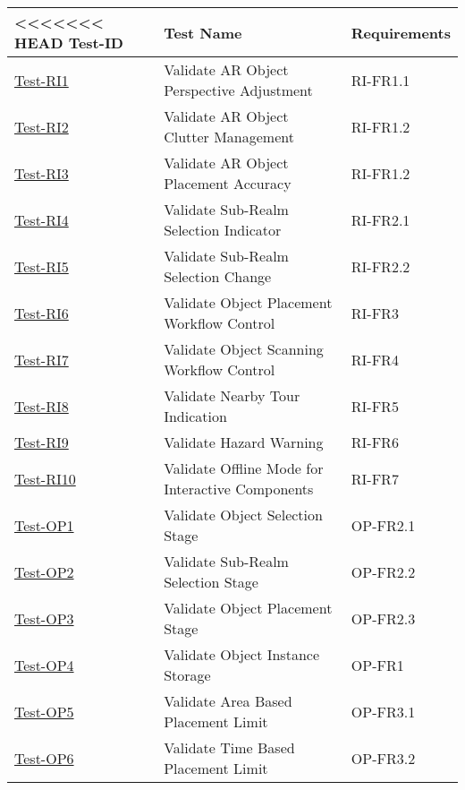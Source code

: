 \documentclass[12pt, titlepage]{article}
\begin{document}
\begin{enumerate}
\begin{table}[h!]
    \centering
    \begin{tabular}{|l|l|l|}
        \hline
<<<<<<< HEAD
        \textbf{Test-ID} & \textbf{Test Name} &\textbf{Requirements} \\
        \hline
        \hyperref[itm:Test-RI1]{Test-RI1} & Validate AR Object Perspective Adjustment & RI-FR1.1 \\
        \hline
        \hyperref[itm:Test-RI2]{Test-RI2} & Validate AR Object Clutter Management & RI-FR1.2 \\
        \hline
        \hyperref[itm:Test-RI3]{Test-RI3} & Validate AR Object Placement Accuracy & RI-FR1.2 \\
        \hline
        \hyperref[itm:Test-RI4]{Test-RI4} & Validate Sub-Realm Selection Indicator & RI-FR2.1 \\
        \hline
        \hyperref[itm:Test-RI5]{Test-RI5} & Validate Sub-Realm Selection Change & RI-FR2.2 \\
        \hline
        \hyperref[itm:Test-RI6]{Test-RI6} & Validate Object Placement Workflow Control & RI-FR3 \\
        \hline
        \hyperref[itm:Test-RI7]{Test-RI7} & Validate Object Scanning Workflow Control & RI-FR4 \\
        \hline
        \hyperref[itm:Test-RI8]{Test-RI8} & Validate Nearby Tour Indication & RI-FR5 \\
        \hline
        \hyperref[itm:Test-RI9]{Test-RI9} & Validate Hazard Warning & RI-FR6 \\
        \hline
        \hyperref[itm:Test-RI10]{Test-RI10} & Validate Offline Mode for Interactive Components & RI-FR7 \\
        \hline
        \hyperref[itm:Test-OP1]{Test-OP1} & Validate Object Selection Stage & OP-FR2.1 \\
        \hline
        \hyperref[itm:Test-OP2]{Test-OP2} & Validate Sub-Realm Selection Stage & OP-FR2.2 \\
        \hline
        \hyperref[itm:Test-OP3]{Test-OP3} & Validate Object Placement Stage & OP-FR2.3 \\
        \hline
        \hyperref[itm:Test-OP4]{Test-OP4} & Validate Object Instance Storage & OP-FR1 \\
        \hline
        \hyperref[itm:Test-OP5]{Test-OP5} & Validate Area Based Placement Limit & OP-FR3.1 \\
        \hline
        \hyperref[itm:Test-OP6]{Test-OP6} & Validate Time Based Placement Limit & OP-FR3.2 \\

\end{tabular}
\end{table}
\end{enumerate}
\end{document}
